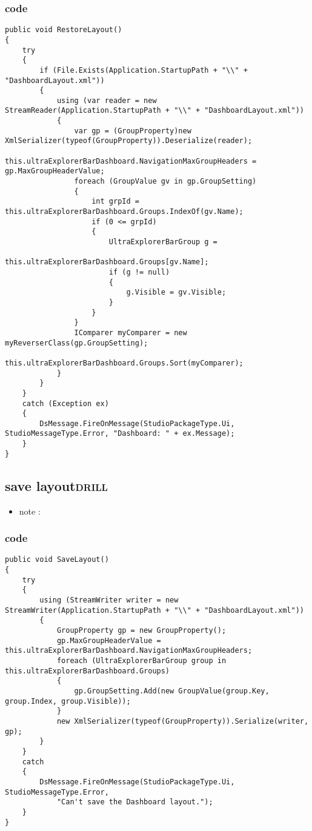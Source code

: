 \documentclass[11pt]{article}
\begin{document}
\subsubsection{code}
\label{sec:orga2a2c45}
\begin{verbatim}
public void RestoreLayout()
{
    try
    {
        if (File.Exists(Application.StartupPath + "\\" + "DashboardLayout.xml"))
        {
            using (var reader = new StreamReader(Application.StartupPath + "\\" + "DashboardLayout.xml"))
            {
                var gp = (GroupProperty)new XmlSerializer(typeof(GroupProperty)).Deserialize(reader);
                this.ultraExplorerBarDashboard.NavigationMaxGroupHeaders = gp.MaxGroupHeaderValue;
                foreach (GroupValue gv in gp.GroupSetting)
                {
                    int grpId = this.ultraExplorerBarDashboard.Groups.IndexOf(gv.Name);
                    if (0 <= grpId)
                    {
                        UltraExplorerBarGroup g =
                            this.ultraExplorerBarDashboard.Groups[gv.Name];
                        if (g != null)
                        {
                            g.Visible = gv.Visible;
                        }
                    }
                }
                IComparer myComparer = new myReverserClass(gp.GroupSetting);
                this.ultraExplorerBarDashboard.Groups.Sort(myComparer);
            }
        }
    }
    catch (Exception ex)
    {
        DsMessage.FireOnMessage(StudioPackageType.Ui, StudioMessageType.Error, "Dashboard: " + ex.Message);
    }
}

\end{verbatim}

\subsection{save layout\hfill{}\textsc{drill}}
\label{sec:org8231777}
\begin{itemize}
\item note :
\end{itemize}
\subsubsection{code}
\label{sec:org751bd2d}
\begin{verbatim}
public void SaveLayout()
{
    try
    {
        using (StreamWriter writer = new StreamWriter(Application.StartupPath + "\\" + "DashboardLayout.xml"))
        {
            GroupProperty gp = new GroupProperty();
            gp.MaxGroupHeaderValue = this.ultraExplorerBarDashboard.NavigationMaxGroupHeaders;
            foreach (UltraExplorerBarGroup group in this.ultraExplorerBarDashboard.Groups)
            {
                gp.GroupSetting.Add(new GroupValue(group.Key, group.Index, group.Visible));
            }
            new XmlSerializer(typeof(GroupProperty)).Serialize(writer, gp);
        }
    }
    catch
    {
        DsMessage.FireOnMessage(StudioPackageType.Ui, StudioMessageType.Error,
            "Can't save the Dashboard layout.");
    }
}

\end{verbatim}
\end{document}
